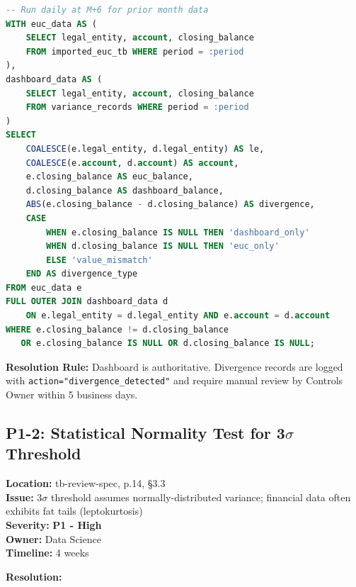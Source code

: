 \begin{lstlisting}[language=SQL,caption={Daily Divergence Detection Query}]
-- Run daily at M+6 for prior month data
WITH euc_data AS (
    SELECT legal_entity, account, closing_balance 
    FROM imported_euc_tb WHERE period = :period
),
dashboard_data AS (
    SELECT legal_entity, account, closing_balance 
    FROM variance_records WHERE period = :period
)
SELECT 
    COALESCE(e.legal_entity, d.legal_entity) AS le,
    COALESCE(e.account, d.account) AS account,
    e.closing_balance AS euc_balance,
    d.closing_balance AS dashboard_balance,
    ABS(e.closing_balance - d.closing_balance) AS divergence,
    CASE 
        WHEN e.closing_balance IS NULL THEN 'dashboard_only'
        WHEN d.closing_balance IS NULL THEN 'euc_only'
        ELSE 'value_mismatch'
    END AS divergence_type
FROM euc_data e
FULL OUTER JOIN dashboard_data d 
    ON e.legal_entity = d.legal_entity AND e.account = d.account
WHERE e.closing_balance != d.closing_balance 
   OR e.closing_balance IS NULL OR d.closing_balance IS NULL;
\end{lstlisting}

\textbf{Resolution Rule:} Dashboard is authoritative. Divergence records are 
logged with \texttt{action="divergence\_detected"} and require manual review 
by Controls Owner within 5 business days.

\subsection{P1-2: Statistical Normality Test for 3$\sigma$ Threshold}
\label{sec:p1-normality}

\begin{tcolorbox}[colback=orange!5,colframe=orange!70,title=\faIcon{exclamation-circle} Finding P1-2: Statistical Assumption Not Validated]
\textbf{Location:} tb-review-spec, p.14, \S3.3\\
\textbf{Issue:} 3$\sigma$ threshold assumes normally-distributed variance; 
financial data often exhibits fat tails (leptokurtosis)\\
\textbf{Severity:} \textbf{P1 - High}\\
\textbf{Owner:} Data Science\\
\textbf{Timeline:} 4 weeks
\end{tcolorbox}

\textbf{Resolution:}

